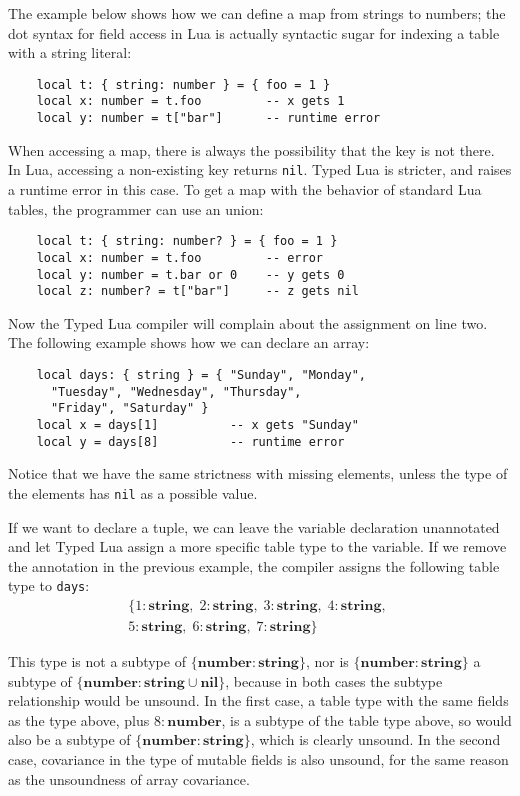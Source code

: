 \documentclass[preprint]{sig-alternate}
\newcommand{\Nil}{\mathbf{nil}}
\newcommand{\Number}{\mathbf{number}}
\newcommand{\String}{\mathbf{string}}
\begin{document}
The example below shows how we can define a map from
strings to numbers; the dot syntax for field access
in Lua is actually syntactic sugar for indexing a table
with a string literal:

\begin{verbatim}
    local t: { string: number } = { foo = 1 }
    local x: number = t.foo         -- x gets 1
    local y: number = t["bar"]      -- runtime error
\end{verbatim}

When accessing a map, there is always the possibility that
the key is not there. In Lua, accessing a non-existing key
returns {\tt nil}. Typed Lua is stricter, and raises a runtime
error in this case. To get a map with the behavior of standard
Lua tables, the programmer can use an union:

\begin{verbatim}
    local t: { string: number? } = { foo = 1 }
    local x: number = t.foo         -- error
    local y: number = t.bar or 0    -- y gets 0
    local z: number? = t["bar"]     -- z gets nil
\end{verbatim}

Now the Typed Lua compiler will complain about the assignment
on line two. The following example shows how we can declare
an array:
\begin{verbatim}
    local days: { string } = { "Sunday", "Monday",
      "Tuesday", "Wednesday", "Thursday",
      "Friday", "Saturday" }
    local x = days[1]          -- x gets "Sunday"
    local y = days[8]          -- runtime error
\end{verbatim}

Notice that we have the same strictness with missing
elements, unless the type of the elements has {\tt nil}
as a possible value.

If we want to declare a tuple, we can leave the
variable declaration unannotated and let Typed Lua assign
a more specific table type to the variable.
If we remove the annotation in the previous example, 
the compiler assigns the following table type to \texttt{days}:
\begin{align*}
\{{1:\String},\;{2:\String},\;{3:\String},\;{4:\String},\;\\
{5:\String},\;{6:\String},\;{7:\String}\}
\end{align*}

This type is not a subtype of $\{\Number:\String\}$, nor
is $\{\Number:\String\}$ a subtype of $\{\Number:
\String\cup\Nil\}$, because in both cases the subtype
relationship would be unsound. In the first case,
a table type with the same fields as the type above,
plus $8: \Number$, is a subtype of the table type
above, so would also be a subtype of $\{\Number:\String\}$,
which is clearly unsound. In the second case, covariance
in the type of mutable fields is also unsound, for the
same reason as the unsoundness of array covariance.
\end{document}
